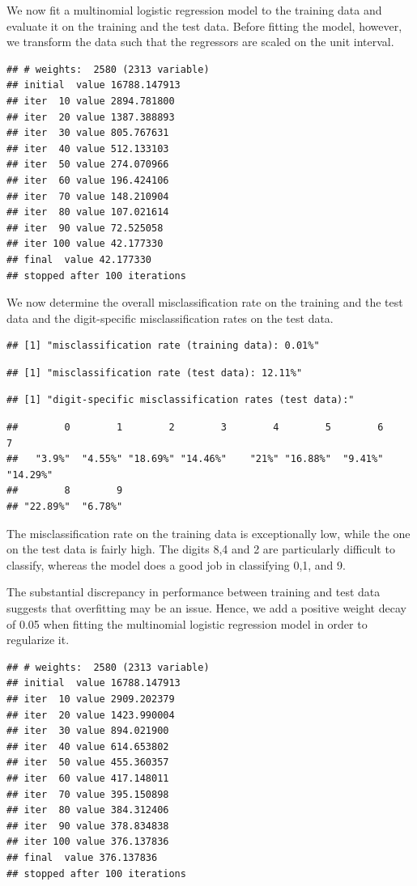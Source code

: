 \documentclass[
]{article}
\begin{document}
We now fit a multinomial logistic regression model to the training data
and evaluate it on the training and the test data. Before fitting the
model, however, we transform the data such that the regressors are
scaled on the unit interval.

\begin{verbatim}
## # weights:  2580 (2313 variable)
## initial  value 16788.147913 
## iter  10 value 2894.781800
## iter  20 value 1387.388893
## iter  30 value 805.767631
## iter  40 value 512.133103
## iter  50 value 274.070966
## iter  60 value 196.424106
## iter  70 value 148.210904
## iter  80 value 107.021614
## iter  90 value 72.525058
## iter 100 value 42.177330
## final  value 42.177330 
## stopped after 100 iterations
\end{verbatim}

We now determine the overall misclassification rate on the training and
the test data and the digit-specific misclassification rates on the test
data.

\begin{verbatim}
## [1] "misclassification rate (training data): 0.01%"
\end{verbatim}

\begin{verbatim}
## [1] "misclassification rate (test data): 12.11%"
\end{verbatim}

\begin{verbatim}
## [1] "digit-specific misclassification rates (test data):"
\end{verbatim}

\begin{verbatim}
##        0        1        2        3        4        5        6        7 
##   "3.9%"  "4.55%" "18.69%" "14.46%"    "21%" "16.88%"  "9.41%" "14.29%" 
##        8        9 
## "22.89%"  "6.78%"
\end{verbatim}

The misclassification rate on the training data is exceptionally low,
while the one on the test data is fairly high. The digits 8,4 and 2 are
particularly difficult to classify, whereas the model does a good job in
classifying 0,1, and 9.

The substantial discrepancy in performance between training and test
data suggests that overfitting may be an issue. Hence, we add a positive
weight decay of 0.05 when fitting the multinomial logistic regression
model in order to regularize it.

\begin{verbatim}
## # weights:  2580 (2313 variable)
## initial  value 16788.147913 
## iter  10 value 2909.202379
## iter  20 value 1423.990004
## iter  30 value 894.021900
## iter  40 value 614.653802
## iter  50 value 455.360357
## iter  60 value 417.148011
## iter  70 value 395.150898
## iter  80 value 384.312406
## iter  90 value 378.834838
## iter 100 value 376.137836
## final  value 376.137836 
## stopped after 100 iterations
\end{verbatim}
\end{document}
